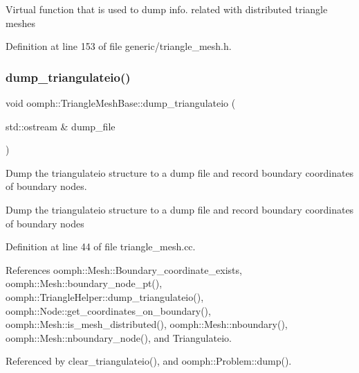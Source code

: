 Virtual function that is used to dump info. related with distributed triangle meshes 

Definition at line 153 of file generic/triangle\+\_\+mesh.\+h.

\mbox{\label{classoomph_1_1TriangleMeshBase_a3b27444232702a4bbbeb95aa9c963c07}} 
\subsubsection{\texorpdfstring{dump\+\_\+triangulateio()}{dump\_triangulateio()}}
{\footnotesize\ttfamily void oomph\+::\+Triangle\+Mesh\+Base\+::dump\+\_\+triangulateio (\begin{DoxyParamCaption}\item[{std\+::ostream \&}]{dump\+\_\+file }\end{DoxyParamCaption})}



Dump the triangulateio structure to a dump file and record boundary coordinates of boundary nodes. 

Dump the triangulateio structure to a dump file and record boundary coordinates of boundary nodes 

Definition at line 44 of file triangle\+\_\+mesh.\+cc.



References oomph\+::\+Mesh\+::\+Boundary\+\_\+coordinate\+\_\+exists, oomph\+::\+Mesh\+::boundary\+\_\+node\+\_\+pt(), oomph\+::\+Triangle\+Helper\+::dump\+\_\+triangulateio(), oomph\+::\+Node\+::get\+\_\+coordinates\+\_\+on\+\_\+boundary(), oomph\+::\+Mesh\+::is\+\_\+mesh\+\_\+distributed(), oomph\+::\+Mesh\+::nboundary(), oomph\+::\+Mesh\+::nboundary\+\_\+node(), and Triangulateio.



Referenced by clear\+\_\+triangulateio(), and oomph\+::\+Problem\+::dump().

\mbox{\label{classoomph_1_1TriangleMeshBase_ad3f02167046a1f96481b87dc48b09032}} 
